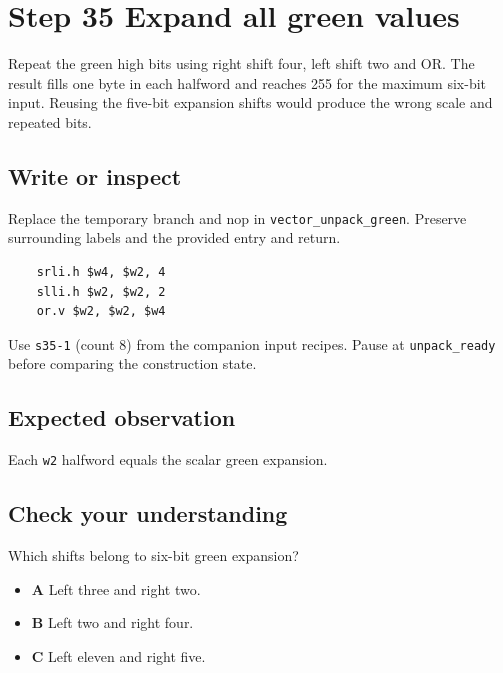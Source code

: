 \section{Step 35 Expand all green values}\label{rgb-s35}

Repeat the green high bits using right shift four, left shift two and OR. The result fills one byte in each halfword and reaches 255 for the maximum six-bit input. Reusing the five-bit expansion shifts would produce the wrong scale and repeated bits.

\subsection{Write or inspect}
Replace the temporary branch and nop in \texttt{vector\_unpack\_green}. Preserve surrounding labels and the provided entry and return.

\begin{verbatim}
    srli.h $w4, $w2, 4
    slli.h $w2, $w2, 2
    or.v $w2, $w2, $w4
\end{verbatim}
Use \texttt{s35-1} (count 8) from the companion input recipes. Pause at \texttt{unpack\_ready} before comparing the construction state.

\subsection{Expected observation}
Each \texttt{w2} halfword equals the scalar green expansion.

\subsection{Check your understanding}
Which shifts belong to six-bit green expansion?

\begin{itemize}
  \item \textbf{A} Left three and right two.
  \item \textbf{B} Left two and right four.
  \item \textbf{C} Left eleven and right five.
\end{itemize}
